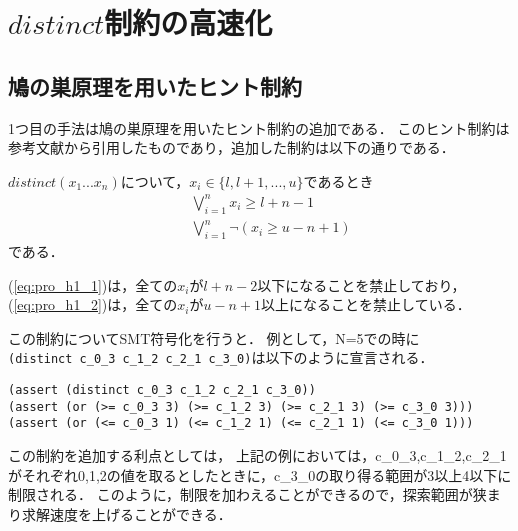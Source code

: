 \section{$distinct$制約の高速化}\label{sec:pro_hint}


\subsection{鳩の巣原理を用いたヒント制約}\label{sec:pro_hint_1}
1つ目の手法は鳩の巣原理を用いたヒント制約の追加である．
このヒント制約は参考文献\cite{Tamura:queen}から引用したものであり，追加した制約は以下の通りである．

$distinct(x_1 ... x_n)$について，$x_i \in \{l, l+1, ..., u\}$であるとき
\begin{eqnarray}
&& \bigvee_{i=1}^n   x_i \geq l+n-1\\
\label{eq:pro_h1_1}
&& \bigvee_{i=1}^n \lnot(x_i \geq u-n+1)
\label{eq:pro_h1_2}
\end{eqnarray}
である．

(\ref{eq:pro_h1_1})は，全ての$x_i$が$l+n-2$以下になることを禁止しており，
(\ref{eq:pro_h1_2})は，全ての$x_i$が$u-n+1$以上になることを禁止している．

この制約についてSMT符号化を行うと．
例として，N=5での時に\\
\verb|(distinct c_0_3 c_1_2 c_2_1 c_3_0)|は以下のように宣言される．

{ \footnotesize \begin{verbatim}
(assert (distinct c_0_3 c_1_2 c_2_1 c_3_0))
(assert (or (>= c_0_3 3) (>= c_1_2 3) (>= c_2_1 3) (>= c_3_0 3)))
(assert (or (<= c_0_3 1) (<= c_1_2 1) (<= c_2_1 1) (<= c_3_0 1)))
\end{verbatim}}

この制約を追加する利点としては，
上記の例においては，c\_0\_3,c\_1\_2,c\_2\_1がそれぞれ0,1,2の値を取るとしたときに，c\_3\_0の取り得る範囲が3以上4以下に制限される．
このように，制限を加わえることができるので，探索範囲が狭まり求解速度を上げることができる．


